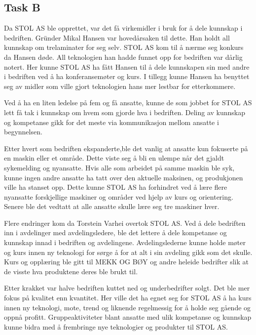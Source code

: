 \subsection{Task B}
Da STOL AS ble opprettet, var det få virkemidler i bruk for å dele kunnskap i bedriften. 
Gründer Mikal Hansen var hovedårsaken til dette.
Han holdt all kunnskap om trelaminater for seg selv. STOL AS kom til å nærme seg konkurs da Hansen døde.
All teknologien han hadde funnet opp for bedriften var dårlig notert. 
Her kunne STOL AS ha fått Hansen til å dele kunnskapen sin med andre i bedriften ved å ha konferansemøter og kurs. I tillegg kunne Hansen ha benyttet seg av midler som ville gjort teknologien hans mer lestbar for etterkommere.

Ved å ha en liten ledelse på fem og få ansatte, kunne de som jobbet for STOL AS lett få tak i kunnskap om hvem som gjorde hva i bedriften. Deling av kunnskap og kompetanse gikk for det meste via kommunikasjon mellom ansatte i begynnelsen.

Etter hvert som bedriften ekspanderte,ble det vanlig at ansatte kun fokuserte på en maskin eller et område.
Dette viste seg å bli en ulempe når det gjaldt sykemelding og nyansatte. 
Hvis alle som arbeidet på samme maskin ble syk, kunne ingen andre ansatte ha tatt over den aktuelle maksinen, og produkjonen ville ha stanset opp.
Dette kunne STOL AS ha forhindret ved å lære flere nyansatte forskjellige maskiner og områder ved hjelp av kurs og orientering.
Senere ble det vedtatt at alle ansatte skulle lære seg tre maskiner hver.

Flere endringer kom da Torstein Varhei overtok STOL AS.
Ved å dele bedriften inn i avdelinger med avdelingsledere, ble det lettere å dele kompetanse og kunnskap innad i bedriften og avdelingene.
Avdelingslederne kunne holde møter og kurs innen ny teknologi for sørge å for at alt i sin avdeling gikk som det skulle.
Kurs og opplæring ble gitt til MEKK OG BØY og andre heleide bedrifter slik at de visste hva produktene deres ble brukt til.

Etter krakket var halve bedriften kuttet ned og underbedrifter solgt. Det ble mer fokus på kvalitet enn kvantitet.
Her ville det ha egnet seg for STOL AS å ha kurs innen ny teknologi, mote, trend og liknende regelmessig for å holde seg gående og oppnå profitt.
Gruppeaktiviteter blant ansatte med ulik kompetanse og kunnskap kunne bidra med å frembringe nye teknologier og produkter til STOL AS.
